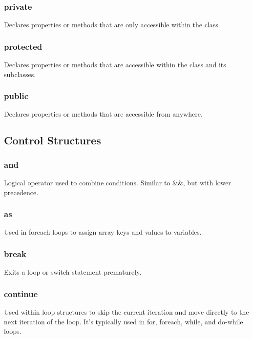\documentclass{report}
\begin{document}
    \bigbreak \noindent 
    \subsubsection{private}
    \bigbreak \noindent 
    Declares properties or methods that are only accessible within the class.

    \bigbreak \noindent 
    \subsubsection{protected}
    \bigbreak \noindent 
    Declares properties or methods that are accessible within the class and its subclasses.

    \bigbreak \noindent 
    \subsubsection{public}
    \bigbreak \noindent 
    Declares properties or methods that are accessible from anywhere.

    \pagebreak 
    \subsection{Control Structures}
    \bigbreak \noindent 
    \subsubsection{and}
    Logical operator used to combine conditions. Similar to \&\&, but with lower precedence.

    \bigbreak \noindent 
    \subsubsection{as}
    \bigbreak \noindent 
    Used in foreach loops to assign array keys and values to variables.
    
    \bigbreak \noindent 
    \subsubsection{break}
    Exits a loop or switch statement prematurely.

    \bigbreak \noindent 
    \subsubsection{continue}
    \bigbreak \noindent 
    Used within loop structures to skip the current iteration and move directly to the next iteration of the loop. It’s typically used in for, foreach, while, and do-while loops.
\end{document}
